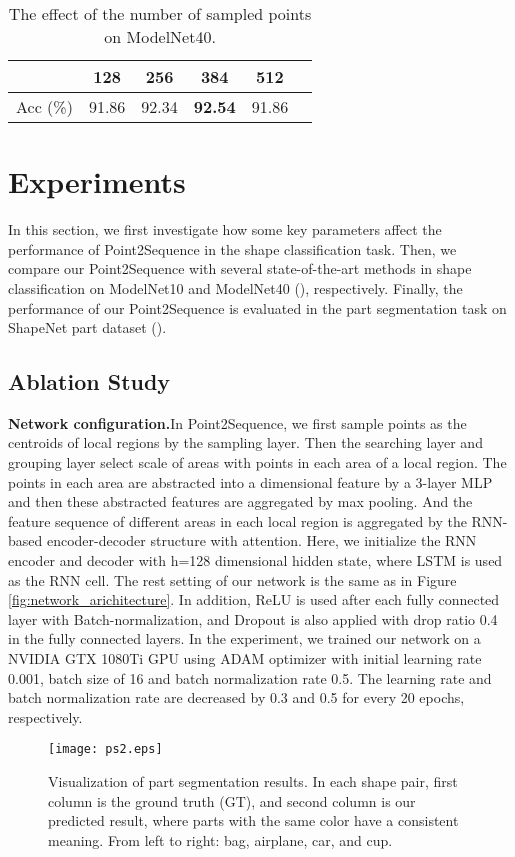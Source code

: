 \documentclass[letterpaper]{article}
\begin{document}
\begin{table}[tp]
\centering
\caption{The effect of the number of sampled points  on ModelNet40.}
\label{table:sample_points}
\begin{tabular}{cccccc}\hline
&128&256&384&512\\ \hline
Acc (\%)&91.86&92.34&\textbf{92.54}&91.86\\ \hline
\end{tabular}
\end{table}
\section{Experiments}
In this section, we first investigate how some key parameters affect the performance of Point2Sequence in the shape classification task.
Then, we compare our Point2Sequence with several state-of-the-art methods in shape classification on ModelNet10 and ModelNet40 (\citealt{wu20153d}), respectively.
Finally, the performance of our Point2Sequence is evaluated in the part segmentation task on ShapeNet part dataset (\citealt{savva2016shrec}).

\subsection{Ablation Study}
\noindent
\textbf{Network configuration.}\quad In Point2Sequence, we first sample  points as the centroids of local regions by the sampling layer.
Then the searching layer and grouping layer select  scale of areas with  points in each area of a local region.
The points in each area are abstracted into a  dimensional feature by a 3-layer MLP and then these abstracted features are aggregated by max pooling.
And the feature sequence of different areas in each local region is aggregated by the RNN-based encoder-decoder structure with attention.
Here, we initialize the RNN encoder and decoder with h=128 dimensional hidden state, where LSTM is used as the RNN cell.
The rest setting of  our network is the same as in Figure \ref{fig:network_arichitecture}.
In addition, ReLU is used after each fully connected layer with Batch-normalization, and Dropout is also applied with drop ratio 0.4 in the fully connected layers. 
In the experiment, we trained our network on a NVIDIA GTX 1080Ti GPU using ADAM optimizer with initial learning rate 0.001, batch size of 16 and batch normalization rate 0.5.
The learning rate and batch normalization rate are decreased by 0.3 and 0.5 for every 20 epochs, respectively.
\begin{figure*}[htp]
\centering 
\texttt{[image: ps2.eps]}
\caption{Visualization of part segmentation results. In each shape pair, first column is the ground truth (GT), and second column is our predicted result, where parts with the same color have a consistent meaning. From left to right: bag, airplane, car, and cup.} \label{fig:part_segmentation}  \end{figure*}
\end{document}
